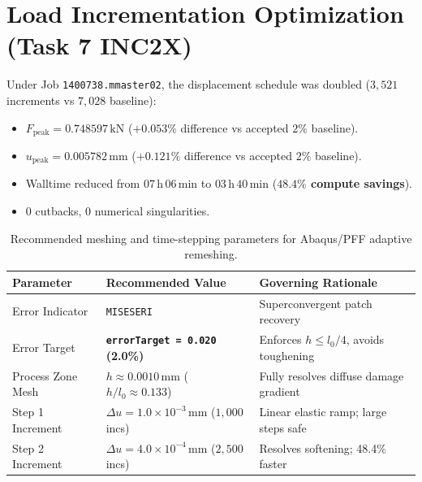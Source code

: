 \documentclass[11pt,a4paper]{report}
\begin{document}
\section{Load Incrementation Optimization (Task 7 INC2X)}
\label{sec:sens_inc}
Under Job \texttt{1400738.mmaster02}, the displacement schedule was doubled ($3{,}521$ increments vs $7{,}028$ baseline):
\begin{itemize}
    \item $F_{\text{peak}} = 0.748597\,\mathrm{kN}$ ($+0.053\%$ difference vs accepted $2\%$ baseline).
    \item $u_{\text{peak}} = 0.005782\,\mathrm{mm}$ ($+0.121\%$ difference vs accepted $2\%$ baseline).
    \item Walltime reduced from $07\,\mathrm{h}\,06\,\mathrm{min}$ to $03\,\mathrm{h}\,40\,\mathrm{min}$ (\textbf{$48.4\%$ compute savings}).
    \item $0$ cutbacks, $0$ numerical singularities.
\end{itemize}

\begin{table}[htbp]
\centering
\small
\caption{Recommended meshing and time-stepping parameters for Abaqus/PFF adaptive remeshing.}
\label{tab:parameter_recommendations}
\begin{tabular}{lll}
\toprule
\textbf{Parameter} & \textbf{Recommended Value} & \textbf{Governing Rationale} \\
\midrule
Error Indicator & \texttt{MISESERI} & Superconvergent patch recovery \\
Error Target & \textbf{\texttt{errorTarget = 0.020} (2.0\%)} & Enforces $h \le l_0/4$, avoids toughening \\
Process Zone Mesh & $h \approx 0.0010\,\mathrm{mm}$ ($h/l_0 \approx 0.133$) & Fully resolves diffuse damage gradient \\
Step 1 Increment & $\Delta u = 1.0 \times 10^{-3}\,\mathrm{mm}$ ($1{,}000$ incs) & Linear elastic ramp; large steps safe \\
Step 2 Increment & $\Delta u = 4.0 \times 10^{-4}\,\mathrm{mm}$ ($2{,}500$ incs) & Resolves softening; 48.4\% faster \\
\bottomrule
\end{tabular}
\end{table}

\end{document}
